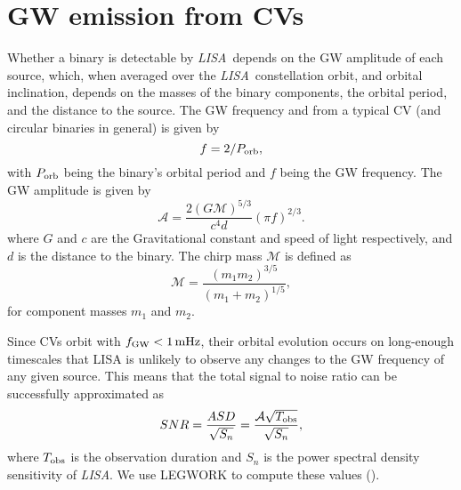 \documentclass[fleqn,usenatbib]{mnras}
\newcommand{\lisa}{{\it LISA}}
\begin{document}
\section{GW emission from CVs} \label{sec:gwemission}


Whether a binary is detectable by \lisa\ depends on the GW amplitude of each source, which, when averaged over the \lisa\ constellation orbit, and orbital inclination, depends on the masses of the binary components, the orbital period, and the distance to the source. The GW frequency and from a typical CV (and circular binaries in general) is given by
\begin{equation}
    f = 2/P_{\rm orb},
\end{equation}
with $P_{\rm orb}$ being the binary's orbital period and $f$ being the GW frequency. The GW amplitude is given by
\begin{equation}\label{eqn:amp}
    \mathcal{A} = \frac{2 (G \mathcal{M})^{5/3} }{c^4 d} (\pi f)^{2/3}.
\end{equation}
where $G$ and $c$ are the Gravitational constant and speed of light respectively, and $d$ is the distance to the binary. The chirp mass $\mathcal{M}$ is defined as
\begin{equation}\label{eqn:mchirp}
    \mathcal{M} = \frac{(m_1 m_2)^{3/5}}{(m_1 + m_2)^{1/5}}, 
\end{equation}
for component masses $m_1$ and $m_2$.

Since CVs orbit with $f_{\rm{GW}} < 1\,\rm{mHz}$, their orbital evolution occurs on long-enough timescales that LISA is unlikely to observe any changes to the GW frequency of any given source. This means that the total signal to noise ratio can be successfully approximated as
\begin{equation}\label{eq:SNR}
    SNR = \frac{ASD}{\sqrt{S_n}} = \frac{\mathcal{A}\sqrt{T_{\rm{obs}}}}{\sqrt{S_n}},
\end{equation}
\noindent where $T_{\rm{obs}}$ is the observation duration and $S_n$ is the power spectral density sensitivity of \lisa. We use LEGWORK to compute these values (\citealt{LEGWORK_apjs,LEGWORK_joss}).
\end{document}
